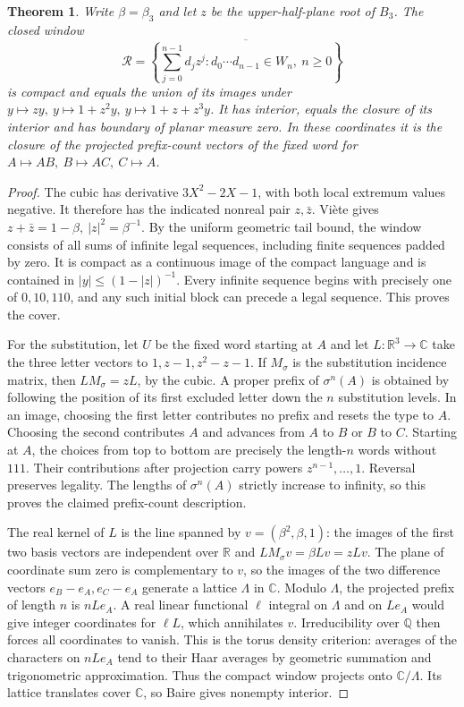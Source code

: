 \documentclass[11pt,reqno]{amsart}
\newtheorem{theorem}{Theorem}[section]
\theoremstyle{definition}
\theoremstyle{remark}
\numberwithin{equation}{section}
\newcommand{\R}{\mathbb{R}}
\newcommand{\C}{\mathbb{C}}
\newcommand{\Q}{\mathbb{Q}}
\begin{document}
\begin{theorem}\label{m9:rauzy}
Write \(\beta=\beta_3\) and let \(z\) be the upper-half-plane root
of \(B_3\). The closed window
\[
 \mathcal R=\overline{\left\{\sum_{j=0}^{n-1}d_jz^j:
                   d_0\cdots d_{n-1}\in W_n,\ n\ge0\right\}}
\]
is compact and equals the union of its images under
\(y\mapsto zy,\ y\mapsto1+z^2y,\ y\mapsto1+z+z^3y\).
It has interior, equals the closure of its interior and has
boundary of planar measure zero. In these coordinates it is the
closure of the projected prefix-count vectors of the fixed word
for \(A\mapsto AB,\ B\mapsto AC,\ C\mapsto A\).
\end{theorem}
\begin{proof}
The cubic has derivative \(3X^2-2X-1\), with both local
extremum values negative. It therefore has the indicated nonreal
pair \(z,\bar z\). Vi\`ete gives
\(z+\bar z=1-\beta,\ |z|^2=\beta^{-1}\).
By the uniform geometric tail bound, the window consists of
all sums of infinite legal sequences, including finite sequences
padded by zero. It is compact as a continuous image of the
compact language and is contained in \(|y|\le(1-|z|)^{-1}\).
Every infinite sequence begins with precisely one of
\(0,10,110\), and any such initial block can precede a legal
sequence. This proves the cover.

For the substitution, let \(U\) be the fixed word starting at
\(A\) and let \(L:\R^3\to\C\) take the three letter vectors to
\(1,z-1,z^2-z-1\). If \(M_\sigma\) is the substitution incidence
matrix, then \(LM_\sigma=zL\), by the cubic. A proper prefix of
\(\sigma^n(A)\) is obtained by following the position of its first
excluded letter down the \(n\) substitution levels. In an image,
choosing the first letter contributes no prefix and resets the
type to \(A\). Choosing the second contributes \(A\) and advances
from \(A\) to \(B\) or \(B\) to \(C\). Starting at \(A\), the
choices from top to bottom are precisely the length-\(n\) words
without \(111\). Their contributions after projection carry
powers \(z^{n-1},\ldots,1\). Reversal preserves legality.
The lengths of \(\sigma^n(A)\) strictly increase to infinity,
so this proves the claimed prefix-count description.

The real kernel of \(L\) is the line spanned by
\(v=(\beta^2,\beta,1)\): the images of the first two basis vectors
are independent over \(\R\) and \(LM_\sigma v=\beta Lv=zLv\).
The plane of coordinate sum zero is complementary to \(v\), so
the images of the two difference vectors \(e_B-e_A,e_C-e_A\)
generate a lattice \(\Lambda\) in \(\C\). Modulo \(\Lambda\),
the projected prefix of length \(n\) is \(nLe_A\).
A real linear functional \(\ell\) integral on \(\Lambda\) and
on \(Le_A\) would give integer coordinates for \(\ell L\),
which annihilates \(v\). Irreducibility over \(\Q\) then forces
all coordinates to vanish. This is the torus density criterion:
averages of the characters on \(nLe_A\) tend to their Haar
averages by geometric summation and trigonometric approximation.
Thus the compact window projects onto \(\C/\Lambda\).
Its lattice translates cover \(\C\), so Baire gives nonempty
interior.


\end{proof}
\end{document}
